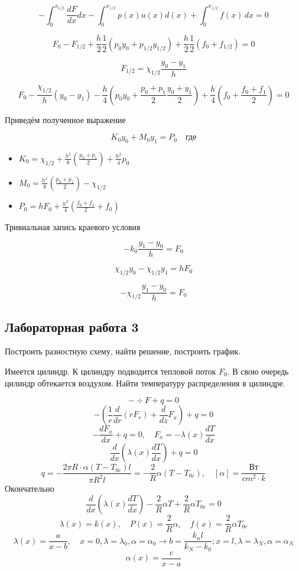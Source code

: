\[
	- \int_{0}^{x_{1/2}} \frac{dF}{dx} dx - \int_{0}^{x_{1/2}} p(x) u(x) d(x) + \int_{0}^{x_{1/2}} f(x)\, dx = 0
\]

\[
	F_0 - F_{1/2} + \frac{h}{2} \frac{1}{2} (p_0 y_0 + p_{1/2} y_{1/2}) + \frac{h}{2} \frac{1}{2} (f_0 + f_{1/2}) = 0
\]

\[
	F_{1/2} = \chi_{1/2} \frac{y_0 - y_1}{h}
\]

\[
	F_0 - \frac{\chi_{1/2}}{h}(y_0 - y_1) - \frac{h}{4}\left(p_0 y_0 + \frac{p_0 + p_1}{2} \frac{y_0 + y_1}{2}\right) + \frac{h}{4} \left(f_0 + \frac{f_0 + f_1}{2} \right) = 0
\]

Приведём полученное выражение

\[
	K_0 y_0 + M_0 y_1 = P_0 \quad \text{где}
\]

\begin{itemize}
\item $K_0 = \chi_{1/2} + \frac{h^2}{8} (\frac{p_0 + p_1}{2}) + \frac{h^2}{4} p_0$
\item $M_0 =  \frac{h^2}{8} (\frac{p_0 + p_1}{2}) - \chi_{1/2}$
\item $P_0 = h F_0 + \frac{h^2}{4}(\frac{f_0 + f_1}{2} + f_0)$
\end{itemize}

Тривиальная запись краевого условия

\[
	- k_0 \frac{y_1 - y_0}{h} = F_0
\]

\[
	\chi_{1/2} y_0 - \chi_{1/2} y_1 = h F_0
\]

\[
	- \chi_{1/2} \frac{y_1 - y_0}{h} = F_0
\]



\subsection{Лабораторная работа 3}

Построить разностную схему, найти решение, построить график.

Имеется цилиндр. К цилиндру подводится тепловой поток $F_0$. В свою очередь цилиндр обтекается воздухом. Найти температуру распределения в цилиндре.

\[
	- \div F + q = 0
\]
\[
	- \left(\frac{1}{r} \frac{d}{dr} (r F_r) + \frac{d}{dz} F_x\right) + q = 0
\]
\[
	- \frac{dF_x}{dx} + q = 0, \quad F_x = - \lambda(x) \frac{dT}{dx}
\]
\[
	\frac{d}{dx}(\lambda (x) \frac{dT}{dx}) + q = 0
\]
\[
	q = - \frac{2\pi R \cdot \alpha(T - T_{0c}) l}{\pi R^2 l} = - \frac{2}{R} \alpha (T - T_{0c}), \quad [\alpha] = \frac{\text{Вт}}{cm^2 \cdot k}
\]
Окончательно
\[
\frac{d}{dx}(\lambda(x) \frac{dT}{dx}) - \frac{2}{R} \alpha T + \frac{2}{R}\alpha T_{0c} = 0
\]
\[
	\lambda(x) = k(x), \quad P(x) = \frac{2}{R}\alpha, \quad f(x) = \frac{2}{R}\alpha T_{0c}
\]
\[
	\lambda(x) = \frac{a}{x - b}, \quad x = 0, \lambda = \lambda_0, \alpha = \alpha_0 \rightarrow b = \frac{k_n l}{k_N - k_0}; x = l, \lambda = \lambda_N, \alpha = \alpha_N
\]
\[
	\alpha(x) = \frac{c}{x - a}
\]

